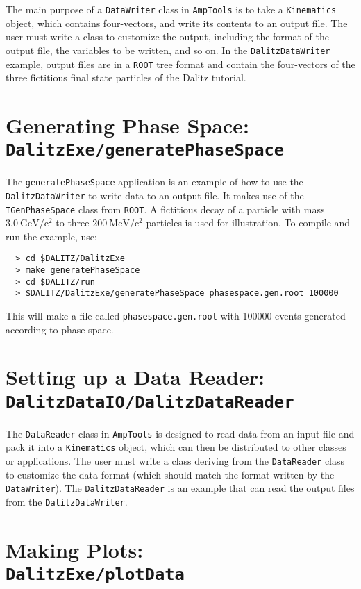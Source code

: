 \documentclass[11pt]{article}
\newcommand{\gevcc}{\mathrm{GeV/c^2}}
\newcommand{\mevcc}{\mathrm{MeV/c^2}}
\begin{document}
The main purpose of a {\tt DataWriter} class in {\tt AmpTools} is to take a {\tt Kinematics} object, which contains four-vectors, and write its contents to an output file.  The user must write a class to customize the output, including the format of the output file, the variables to be written, and so on.  In the {\tt DalitzDataWriter} example, output files are in a {\tt ROOT} tree format and contain the four-vectors of the three fictitious final state particles of the Dalitz tutorial.

\section{Generating Phase Space: \\  
{\tt DalitzExe/generatePhaseSpace}}
\label{sec:ps}

The {\tt generatePhaseSpace} application is an example of how to use the {\tt DalitzDataWriter} to write data to an output file.  It makes use of the {\tt TGenPhaseSpace} class from {\tt ROOT}.  A fictitious decay of a particle with mass $3.0~\gevcc$ to three $200~\mevcc$ particles is used for illustration.  To compile and run the example, use:
\begin{verbatim}
  > cd $DALITZ/DalitzExe
  > make generatePhaseSpace
  > cd $DALITZ/run
  > $DALITZ/DalitzExe/generatePhaseSpace phasespace.gen.root 100000
\end{verbatim}
This will make a file called {\tt phasespace.gen.root} with 100000 events generated according to phase space.

\section{Setting up a Data Reader: \\
{\tt DalitzDataIO/DalitzDataReader}}
\label{sec:dr}

The {\tt DataReader} class in {\tt AmpTools} is designed to read data from an input file and pack it into a {\tt Kinematics} object, which can then be distributed to other classes or applications.  The user must write a class deriving from the {\tt DataReader} class to customize the data format (which should match the format written by the {\tt DataWriter}).  The {\tt DalitzDataReader} is an example that can read the output files from the {\tt DalitzDataWriter}.

\section{Making Plots: \\
{\tt DalitzExe/plotData}}
\label{sec:plot}
\end{document}
